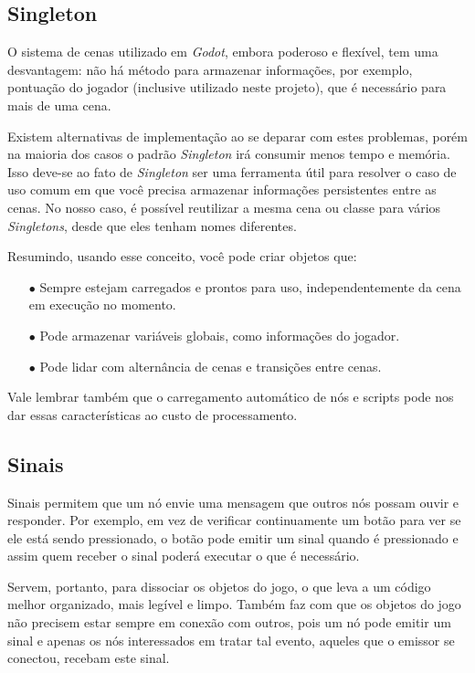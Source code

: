 \subsection{Singleton}

O sistema de cenas utilizado em \textit{Godot}, embora poderoso e flexível, tem 
uma desvantagem: não há método para armazenar informações, por exemplo, 
pontuação do jogador (inclusive utilizado neste projeto), que é necessário para 
mais de uma cena.

Existem alternativas de implementação ao se deparar com estes problemas, porém
na maioria dos casos o padrão \textit{Singleton} irá consumir menos tempo e
memória. Isso deve-se ao fato de \textit{Singleton} ser uma ferramenta útil para
resolver o caso de uso comum em que você precisa armazenar informações 
persistentes entre as cenas. No nosso caso, é possível reutilizar a mesma cena 
ou classe para vários \textit{Singletons}, desde que eles tenham 
nomes diferentes.

Resumindo, usando esse conceito, você pode criar objetos que:

\begin{itemize}
    \item[$\bullet$]
        Sempre estejam carregados e prontos para uso, independentemente da cena 
        em execução no momento.
    \item[$\bullet$]
        Pode armazenar variáveis globais, como informações do jogador.
    \item[$\bullet$]
        Pode lidar com alternância de cenas e transições entre cenas.
\end{itemize}

Vale lembrar também que o carregamento automático de nós e scripts pode nos dar 
essas características ao custo de processamento.

\subsection{Sinais}

Sinais permitem que um nó envie uma mensagem que outros nós possam ouvir e 
responder. Por exemplo, em vez de verificar continuamente um botão para ver se 
ele está sendo pressionado, o botão pode emitir um sinal quando é pressionado e
assim quem receber o sinal poderá executar o que é necessário.

Servem, portanto, para dissociar os objetos do jogo, o que leva a um código 
melhor organizado, mais legível e limpo. Também faz com que os objetos do jogo
não precisem estar sempre em conexão com outros, pois um nó pode emitir um sinal
e apenas os nós interessados em tratar tal evento, aqueles que o emissor se
conectou, recebam este sinal.

